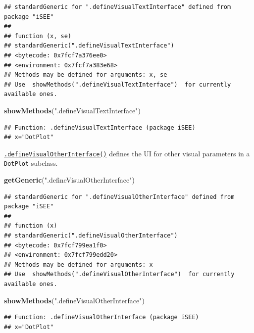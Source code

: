 \documentclass[
]{book}
\newenvironment{Shaded}{\begin{snugshade}}{\end{snugshade}}
\newcommand{\KeywordTok}[1]{\textcolor[rgb]{0.13,0.29,0.53}{\textbf{#1}}}
\newcommand{\NormalTok}[1]{#1}
\newcommand{\StringTok}[1]{\textcolor[rgb]{0.31,0.60,0.02}{#1}}
\begin{document}
\begin{verbatim}
## standardGeneric for ".defineVisualTextInterface" defined from package "iSEE"
## 
## function (x, se) 
## standardGeneric(".defineVisualTextInterface")
## <bytecode: 0x7fcf7a376ee0>
## <environment: 0x7fcf7a383e68>
## Methods may be defined for arguments: x, se
## Use  showMethods(".defineVisualTextInterface")  for currently available ones.
\end{verbatim}

\begin{Shaded}
\begin{Highlighting}[]
\KeywordTok{showMethods}\NormalTok{(}\StringTok{".defineVisualTextInterface"}\NormalTok{)}
\end{Highlighting}
\end{Shaded}

\begin{verbatim}
## Function: .defineVisualTextInterface (package iSEE)
## x="DotPlot"
\end{verbatim}

\href{https://isee.github.io/iSEE/reference/visual-parameters-generics.html}{\texttt{.defineVisualOtherInterface()}} defines the UI for other visual parameters in a \texttt{DotPlot} subclass.

\begin{Shaded}
\begin{Highlighting}[]
\KeywordTok{getGeneric}\NormalTok{(}\StringTok{".defineVisualOtherInterface"}\NormalTok{)}
\end{Highlighting}
\end{Shaded}

\begin{verbatim}
## standardGeneric for ".defineVisualOtherInterface" defined from package "iSEE"
## 
## function (x) 
## standardGeneric(".defineVisualOtherInterface")
## <bytecode: 0x7fcf799ea1f0>
## <environment: 0x7fcf799edd20>
## Methods may be defined for arguments: x
## Use  showMethods(".defineVisualOtherInterface")  for currently available ones.
\end{verbatim}

\begin{Shaded}
\begin{Highlighting}[]
\KeywordTok{showMethods}\NormalTok{(}\StringTok{".defineVisualOtherInterface"}\NormalTok{)}
\end{Highlighting}
\end{Shaded}

\begin{verbatim}
## Function: .defineVisualOtherInterface (package iSEE)
## x="DotPlot"
\end{verbatim}
\end{document}
